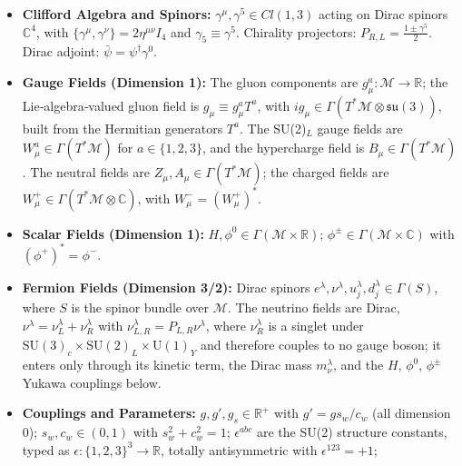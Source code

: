 \documentclass{article}
\begin{document}
\begin{itemize}
    Repeated Lorentz, colour, adjoint, weak-isospin, and generation indices are summed over their declared domains unless explicitly stated otherwise. Generation labels carried by mass parameters ($m_e^\kappa$, $m_\nu^\lambda$, $m_u^\lambda$, $m_d^\lambda$) are diagonal parameter values selected by the accompanying field index, not additional contracted indices; a generation index may therefore occur more than twice in a single monomial without implying a further sum.
    \item \textbf{Clifford Algebra and Spinors:} 
    $\gamma^\mu, \gamma^5 \in Cl(1,3)$ acting on Dirac spinors $\mathbb{C}^4$, with $\{\gamma^\mu, \gamma^\nu\} = 2\eta^{\mu\nu}I_4$ and $\gamma_5 \equiv \gamma^5$.
    Chirality projectors: $P_{R,L} = \frac{1 \pm \gamma^5}{2}$.
    Dirac adjoint: $\bar{\psi} = \psi^\dagger \gamma^0$.
    \item \textbf{Gauge Fields (Dimension 1):} 
    The gluon components are $g_\mu^a : \mathcal M \to \mathbb{R}$; the Lie‑algebra‑valued gluon field is $g_\mu \equiv g_\mu^a T^a$, with $i g_\mu \in \Gamma(T^*\mathcal M \otimes \mathfrak{su}(3))$, built from the Hermitian generators $T^a$. The SU(2)$_L$ gauge fields are $W_\mu^a \in \Gamma(T^*\mathcal M)$ for $a \in \{1,2,3\}$, and the hypercharge field is $B_\mu \in \Gamma(T^*\mathcal M)$. The neutral fields are $Z_\mu, A_\mu \in \Gamma(T^*\mathcal M)$; the charged fields are $W_\mu^+ \in \Gamma(T^*\mathcal M \otimes \mathbb{C})$, with $W_\mu^- = (W_\mu^+)^*$.
    \item \textbf{Scalar Fields (Dimension 1):} 
    $H, \phi^0 \in \Gamma(\mathcal M\times\mathbb R)$; $\phi^\pm \in \Gamma(\mathcal M\times\mathbb C)$ with $(\phi^+)^* = \phi^-$.
    \item \textbf{Fermion Fields (Dimension 3/2):} 
    Dirac spinors $e^\lambda, \nu^\lambda, u_j^\lambda, d_j^\lambda \in \Gamma(S)$, where $S$ is the spinor bundle over $\mathcal M$.
    The neutrino fields are Dirac, $\nu^\lambda = \nu_L^\lambda + \nu_R^\lambda$ with $\nu_{L,R}^\lambda = P_{L,R}\nu^\lambda$, where $\nu_R^\lambda$ is a singlet under $\mathrm{SU(3)}_c \times \mathrm{SU(2)}_L \times \mathrm{U(1)}_Y$ and therefore couples to no gauge boson; it enters only through its kinetic term, the Dirac mass $m_\nu^\lambda$, and the $H$, $\phi^0$, $\phi^\pm$ Yukawa couplings below.
    \item \textbf{Couplings and Parameters:} 
    $g, g', g_s \in \mathbb{R}^+$ with $g' = g s_w / c_w$ (all dimension 0); $s_w, c_w \in (0,1)$ with $s_w^2 + c_w^2 = 1$;
    $\epsilon^{abc}$ are the SU(2) structure constants, typed as $\epsilon: \{1,2,3\}^3 \to \mathbb{R}$, totally antisymmetric with $\epsilon^{123} = +1$;

\end{itemize}
\end{document}
